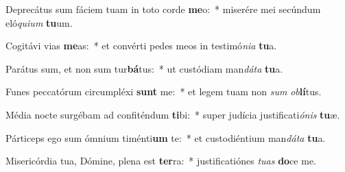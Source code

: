 \item Deprecátus sum fáciem tuam in toto corde \textbf{me}o:~* miserére mei secúndum eló\textit{qui}\textit{um} \textbf{tu}um.
\item Cogitávi vias \textbf{me}as:~* et convérti pedes meos in testimó\textit{ni}\textit{a} \textbf{tu}a.
\item Parátus sum, et non sum tur\textbf{bá}tus:~* ut custódiam man\textit{dá}\textit{ta} \textbf{tu}a.
\item Funes peccatórum circumpléxi \textbf{sunt} me:~* et legem tuam non \textit{sum} \textit{ob}\textbf{lí}tus.
\item Média nocte surgébam ad confiténdum \textbf{ti}bi:~* super judícia justificati\textit{ó}\textit{nis} \textbf{tu}æ.
\item Párticeps ego sum ómnium timénti\textbf{um} te:~* et custodiéntium man\textit{dá}\textit{ta} \textbf{tu}a.
\item Misericórdia tua, Dómine, plena est \textbf{ter}ra:~* justificatiónes \textit{tu}\textit{as} \textbf{do}ce me.
